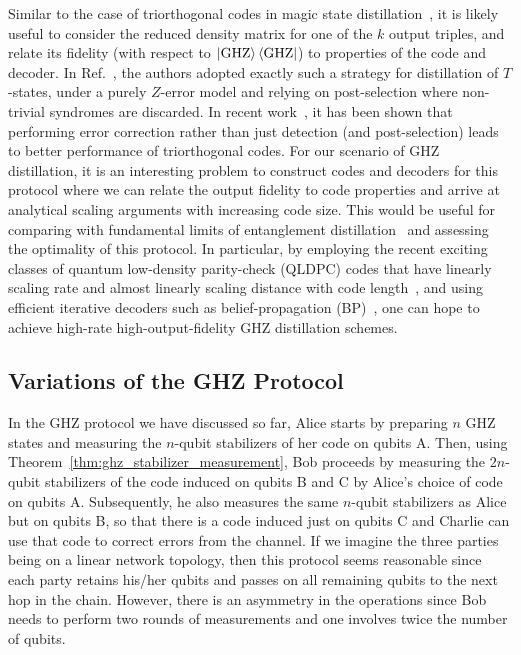 \documentclass[journal,onecolumn]{IEEEtran}
\begin{document}
Similar to the case of triorthogonal codes in magic state distillation~\cite{Bravyi-pra12}, it is likely useful to consider the reduced density matrix for one of the $k$ output triples, and relate its fidelity (with respect to $\dketbra{\text{GHZ}}$) to properties of the code and decoder.
In Ref.~\cite{Bravyi-pra12}, the authors adopted exactly such a strategy for distillation of $T$-states, under a purely $Z$-error model and relying on post-selection where non-trivial syndromes are discarded.
In recent work~\cite{Krishna-arxiv18}, it has been shown that performing error correction rather than just detection (and post-selection) leads to better performance of triorthogonal codes.
For our scenario of GHZ distillation, it is an interesting problem to construct codes and decoders for this protocol where we can relate the output fidelity to code properties and arrive at analytical scaling arguments with increasing code size.
This would be useful for comparing with fundamental limits of entanglement distillation~\cite{Fang-it19} and assessing the optimality of this protocol.
In particular, by employing the recent exciting classes of quantum low-density parity-check (QLDPC) codes that have linearly scaling rate and almost linearly scaling distance with code length~\cite{Hastings-stoc21,Panteleev-arxiv20,Breuckmann-it21,Breuckmann-arxiv21}, and using efficient iterative decoders such as belief-propagation (BP)~\cite{Kschischang-it01,Panteleev-arxiv19}, one can hope to achieve high-rate high-output-fidelity GHZ distillation schemes.




\subsection{Variations of the GHZ Protocol}
\label{sec:ghz_variations}


In the GHZ protocol we have discussed so far, Alice starts by preparing $n$ GHZ states and measuring the $n$-qubit stabilizers of her code on qubits A.
Then, using Theorem~\ref{thm:ghz_stabilizer_measurement}, Bob proceeds by measuring the $2n$-qubit stabilizers of the code induced on qubits B and C by Alice's choice of code on qubits A.
Subsequently, he also measures the same $n$-qubit stabilizers as Alice but on qubits B, so that there is a code induced just on qubits C and Charlie can use that code to correct errors from the channel.
If we imagine the three parties being on a linear network topology, then this protocol seems reasonable since each party retains his/her qubits and passes on all remaining qubits to the next hop in the chain.
However, there is an asymmetry in the operations since Bob needs to perform two rounds of measurements and one involves twice the number of qubits.
\end{document}

